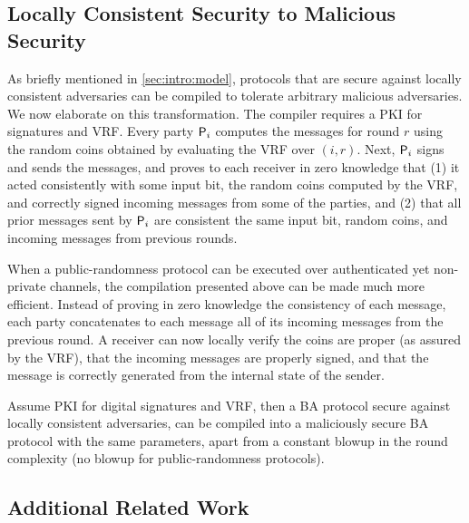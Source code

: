 \subsection{Locally Consistent Security to Malicious Security}\label{sec:intro:LocalToFull}


As briefly mentioned in \cref{sec:intro:model}, protocols that are secure against locally consistent adversaries can be compiled to tolerate arbitrary malicious adversaries. We now elaborate on this transformation.
The compiler requires a PKI for signatures and VRF. Every party $\mathsf{P}_i$ computes the messages for round $r$ using the random coins obtained by evaluating the VRF over $(i,r)$. Next, $\mathsf{P}_i$ signs and sends the messages, and proves to each receiver in zero knowledge that (1) it acted consistently with some input bit, the random coins computed by the VRF, and correctly signed incoming messages from some of the parties, and (2) that all prior messages sent by $\mathsf{P}_i$ are consistent \wrt the same input bit, random coins, and incoming messages from previous rounds.

When a public-randomness protocol can be executed over authenticated yet non-private channels, the compilation presented above can be made much more efficient. Instead of proving in zero knowledge the consistency of each message, each party concatenates to each message all of its incoming messages from the previous round. A receiver can now locally verify the coins are proper (as assured by the VRF), that the incoming messages are properly signed, and that the message is correctly generated from the internal state of the sender.

\begin{theorem}
	Assume PKI for digital signatures and VRF, then a BA protocol secure against locally consistent adversaries, can be compiled into a maliciously secure BA protocol with the same parameters, apart from a constant blowup in the round complexity (no blowup for public-randomness protocols).
\end{theorem}

\subsection{Additional Related Work}\label{sec:relatedWork}

